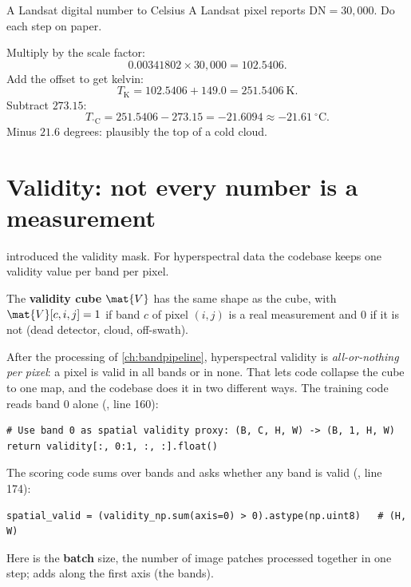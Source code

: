 \begin{worked}[label={we:light:landsat}]{A Landsat digital number to Celsius}
A Landsat pixel reports $\mathrm{DN} = 30{,}000$. Do each step on paper.

Multiply by the scale factor:
\[ 0.00341802 \times 30{,}000 = 102.5406. \]
Add the offset to get kelvin:
\[ T_{\mathrm{K}} = 102.5406 + 149.0 = 251.5406\ \mathrm{K}. \]
Subtract $273.15$:
\[ T_{^\circ\mathrm{C}} = 251.5406 - 273.15 = -21.6094 \approx -21.61\ ^\circ\mathrm{C}. \]
Minus $21.6$ degrees: plausibly the top of a cold cloud.
\end{worked}

\section{Validity: not every number is a measurement}\label{sec:light:validity}

 introduced the validity mask. For hyperspectral data the codebase keeps one
validity value per band per pixel.

\begin{definition}
The \textbf{validity cube} $\mat{V}$ has the same shape  as the cube, with
$\mat{V}[c,i,j] = 1$ if band $c$ of pixel $(i,j)$ is a real measurement and $0$ if it is not
(dead detector, cloud, off-swath).
\end{definition}

After the processing of \cref{ch:bandpipeline}, hyperspectral validity is \emph{all-or-nothing per
pixel}: a pixel is valid in all bands or in none. That lets code collapse the cube to one
 map, and the codebase does it in two different ways. The training code reads band
$0$ alone (, line 160):
\begin{lstlisting}
# Use band 0 as spatial validity proxy: (B, C, H, W) -> (B, 1, H, W)
return validity[:, 0:1, :, :].float()
\end{lstlisting}
The scoring code sums over bands and asks whether any band is valid
(, line 174):
\begin{lstlisting}
spatial_valid = (validity_np.sum(axis=0) > 0).astype(np.uint8)   # (H, W)
\end{lstlisting}
Here  is the \textbf{batch} size, the number of image patches processed
together in one step;  adds along the first axis (the bands).

